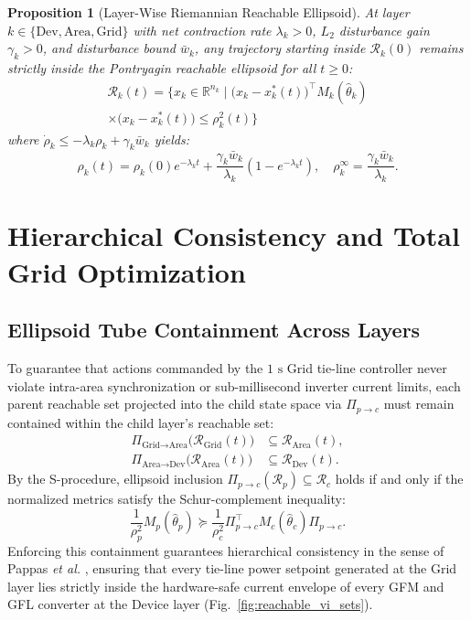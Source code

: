 \documentclass[journal]{IEEEtran}
\newtheorem{proposition}{Proposition}
\begin{document}
\begin{proposition}[Layer-Wise Riemannian Reachable Ellipsoid]
At layer $k \in \{\text{Dev}, \text{Area}, \text{Grid}\}$ with net contraction rate $\lambda_k > 0$, $L_2$ disturbance gain $\gamma_k > 0$, and disturbance bound $\bar{w}_k$, any trajectory starting inside $\mathcal{R}_k(0)$ remains strictly inside the Pontryagin reachable ellipsoid for all $t \ge 0$:
\begin{multline}
\mathcal{R}_k(t) = \Big\{ x_k \in \mathbb{R}^{n_k} \;\Big|\; \big(x_k - x_k^*(t)\big)^\top M_k(\hat{\theta}_k) \\
\times \big(x_k - x_k^*(t)\big) \le \rho_k^2(t) \Big\}
\end{multline}
where $\dot{\rho}_k \le -\lambda_k \rho_k + \gamma_k \bar{w}_k$ yields:
\begin{equation}
\rho_k(t) = \rho_k(0) e^{-\lambda_k t} + \frac{\gamma_k \bar{w}_k}{\lambda_k}\left(1 - e^{-\lambda_k t}\right), \quad \rho_k^{\infty} = \frac{\gamma_k \bar{w}_k}{\lambda_k}.
\end{equation}
\end{proposition}

\section{Hierarchical Consistency and Total Grid Optimization}
\subsection{Ellipsoid Tube Containment Across Layers}
To guarantee that actions commanded by the $1\text{ s}$ Grid tie-line controller never violate intra-area synchronization or sub-millisecond inverter current limits, each parent reachable set projected into the child state space via $\Pi_{p \to c}$ must remain contained within the child layer's reachable set:
\begin{align}
\Pi_{\text{Grid} \to \text{Area}}\big(\mathcal{R}_{\text{Grid}}(t)\big) &\subseteq \mathcal{R}_{\text{Area}}(t), \\
\Pi_{\text{Area} \to \text{Dev}}\big(\mathcal{R}_{\text{Area}}(t)\big) &\subseteq \mathcal{R}_{\text{Dev}}(t).
\end{align}
By the S-procedure, ellipsoid inclusion $\Pi_{p \to c}(\mathcal{R}_p) \subseteq \mathcal{R}_c$ holds if and only if the normalized metrics satisfy the Schur-complement inequality:
\begin{equation}
\frac{1}{\rho_p^2} M_p(\hat{\theta}_p) \succeq \frac{1}{\rho_c^2} \Pi_{p \to c}^\top M_c(\hat{\theta}_c) \Pi_{p \to c}.
\end{equation}
Enforcing this containment guarantees hierarchical consistency in the sense of Pappas \textit{et al.} \cite{pappas98}, ensuring that every tie-line power setpoint generated at the Grid layer lies strictly inside the hardware-safe current envelope of every GFM and GFL converter at the Device layer (Fig.~\ref{fig:reachable_vi_sets}).
\end{document}

